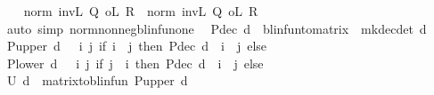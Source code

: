 \begin{isabellebody}
\ \ \isamarkupfalse%
\ {\isachardoublequoteopen}norm\ {\isacharparenleft}{\kern0pt}{\isacharparenleft}{\kern0pt}inv\isactrlsub L\ Q{}\ o\isactrlsub L\ R{}{\isacharparenright}{\kern0pt}{\isacharparenright}{\kern0pt}\ {\isasymle}\ norm\ {\isacharparenleft}{\kern0pt}{\isacharparenleft}{\kern0pt}inv\isactrlsub L\ Q{}\ o\isactrlsub L\ R{}{\isacharparenright}{\kern0pt}{\isacharparenright}{\kern0pt}{\isachardoublequoteclose}\isanewline
\ \ \ \ \isamarkupfalse%
\ {\isacharparenleft}{\kern0pt}auto\ simp{\isacharcolon}{\kern0pt}\ norm{\isacharunderscore}{\kern0pt}nonneg{\isacharunderscore}{\kern0pt}blinfun{\isacharunderscore}{\kern0pt}one\ {\isacharasterisk}{\kern0pt}{\isacharparenright}{\kern0pt}\isanewline
{}\isamarkupfalse%
%
\endisatagproof
{\isafoldproof}%
%
\isadelimproof
%
\endisadelimproof
%
\isadelimdocument
%
\endisadelimdocument
%
\isatagdocument
%
\isamarkuptrue%
%
\isamarkuptrue%
%
\endisatagdocument
{\isafolddocument}%
%
\isadelimdocument
%
\endisadelimdocument
{}\isamarkupfalse%
\ {\isachardoublequoteopen}P{\isacharunderscore}{\kern0pt}dec\ d\ {\isasymequiv}\ blinfun{\isacharunderscore}{\kern0pt}to{\isacharunderscore}{\kern0pt}matrix\ {\isacharparenleft}{\kern0pt}{\isasymP}\ {\isacharparenleft}{\kern0pt}mk{\isacharunderscore}{\kern0pt}dec{\isacharunderscore}{\kern0pt}det\ d{\isacharparenright}{\kern0pt}{\isacharparenright}{\kern0pt}{\isachardoublequoteclose}\isanewline
{}\isamarkupfalse%
\ {\isachardoublequoteopen}P{\isacharunderscore}{\kern0pt}upper\ d\ {\isasymequiv}\ {\isacharparenleft}{\kern0pt}{\isasymchi}\ i\ j{\isachardot}{\kern0pt}\ if\ i\ {\isasymle}\ j\ then\ P{\isacharunderscore}{\kern0pt}dec\ d\ {\isachardollar}{\kern0pt}\ i\ {\isachardollar}{\kern0pt}\ j\ else\ {}{\isacharparenright}{\kern0pt}{\isachardoublequoteclose}\isanewline
{}\isamarkupfalse%
\ {\isachardoublequoteopen}P{\isacharunderscore}{\kern0pt}lower\ d\ {\isasymequiv}\ {\isacharparenleft}{\kern0pt}{\isasymchi}\ i\ j{\isachardot}{\kern0pt}\ if\ j\ {\isacharless}{\kern0pt}\ i\ then\ P{\isacharunderscore}{\kern0pt}dec\ d\ {\isachardollar}{\kern0pt}\ i\ {\isachardollar}{\kern0pt}\ j\ else\ {}{\isacharparenright}{\kern0pt}{\isachardoublequoteclose}\isanewline
\isanewline
{}\isamarkupfalse%
\ {\isachardoublequoteopen}{\isasymP}\isactrlsub U\ d\ {\isacharequal}{\kern0pt}\ matrix{\isacharunderscore}{\kern0pt}to{\isacharunderscore}{\kern0pt}blinfun\ {\isacharparenleft}{\kern0pt}P{\isacharunderscore}{\kern0pt}upper\ d{\isacharparenright}{\kern0pt}{\isachardoublequoteclose}\isanewline

\end{isabellebody}

